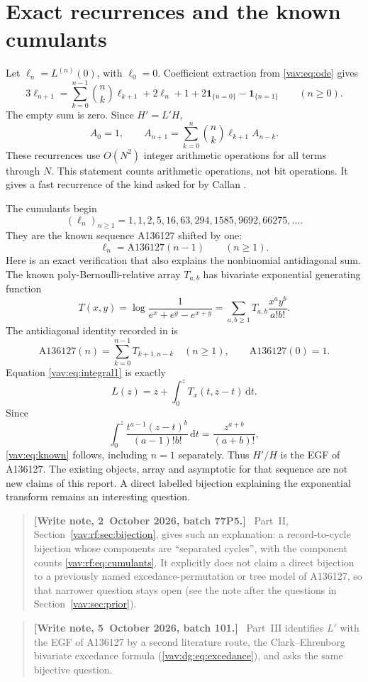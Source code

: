 \documentclass[11pt]{article}
\theoremstyle{remark}\newtheorem{remark}[theorem]{Remark}
\newcommand{\dd}{\,\mathrm d}
\newcommand{\ind}[1]{\mathbf1_{\{#1\}}}
\newenvironment{writenote}{\begin{quote}\small\raggedright\textbf{[Write note, 2~October 2026, batch 77P5.]}\ }{\end{quote}}
\newenvironment{writenoteb}{\begin{quote}\small\raggedright\textbf{[Write note, 5~October 2026, batch 101.]}\ }{\end{quote}}
\begin{document}
\section{Exact recurrences and the known cumulants}\label{vav:sec:cumulants}

Let $\ell_n=L^{(n)}(0)$, with $\ell_0=0$. Coefficient extraction from
\eqref{vav:eq:ode} gives
\begin{equation}\label{vav:eq:cumulant}
 3\ell_{n+1}=\sum_{k=0}^{n-1}\binom nk\ell_{k+1}
       +2\ell_n+1+2\ind{n=0}-\ind{n=1}\qquad(n\ge0).
\end{equation}
The empty sum is zero. Since $H'=L'H$,
\begin{equation}\label{vav:eq:exact}
 A_0=1,\qquad
 A_{n+1}=\sum_{k=0}^n\binom nk\ell_{k+1}A_{n-k}.
\end{equation}
These recurrences use $O(N^2)$ integer arithmetic operations for all
terms through $N$. This statement counts arithmetic operations, not
bit operations. It gives a fast recurrence of the kind asked for by
Callan \cite[Section 9]{callan}.

The cumulants begin
\[
 (\ell_n)_{n\ge1}=1,1,2,5,16,63,294,1585,9692,66275,\ldots.
\]
They are the known sequence A136127 shifted by one:
\begin{equation}\label{vav:eq:known}
 \ell_n=\mathrm{A136127}(n-1)\qquad(n\ge1).
\end{equation}
Here is an exact verification that also explains the nonbinomial
antidiagonal sum. The known poly-Bernoulli-relative array $T_{a,b}$ has
bivariate exponential generating function
\[
 T(x,y)=\log\frac1{e^x+e^y-e^{x+y}}
       =\sum_{a,b\ge1}T_{a,b}\frac{x^ay^b}{a!b!}.
\]
The antidiagonal identity recorded in \cite[Section 6]{testart} is
\[
 \mathrm{A136127}(n)=\sum_{k=0}^{n-1}T_{k+1,n-k}\quad(n\ge1),
 \qquad \mathrm{A136127}(0)=1.
\]
Equation \eqref{vav:eq:integral1} is exactly
\begin{equation}\label{vav:eq:transform}
 L(z)=z+\int_0^z T_x(t,z-t)\dd t.
\end{equation}
Since
\[
 \int_0^z\frac{t^{a-1}(z-t)^b}{(a-1)!b!}\dd t
     =\frac{z^{a+b}}{(a+b)!},
\]
\eqref{vav:eq:known} follows, including $n=1$ separately. Thus $H'/H$ is
the EGF of A136127. The existing objects, array and asymptotic for that
sequence are not new claims of this report. A direct labelled bijection
explaining the exponential transform remains an interesting question.
\begin{writenote}
Part~II, Section~\ref{vav:rf:sec:bijection}, gives such an explanation: a
record-to-cycle bijection whose components are ``separated cycles'', with
the component counts \eqref{vav:rf:eq:cumulants}. It explicitly does not
claim a direct bijection to a previously named excedance-permutation or
tree model of A136127, so that narrower question stays open (see the note
after the questions in Section~\ref{vav:sec:prior}).
\end{writenote}
\begin{writenoteb}
Part~III identifies $L'$ with the EGF of A136127 by a second literature
route, the Clark--Ehrenborg bivariate excedance formula
(\eqref{vav:dg:eq:excedance}), and asks the same bijective question.
\end{writenoteb}
\end{document}
